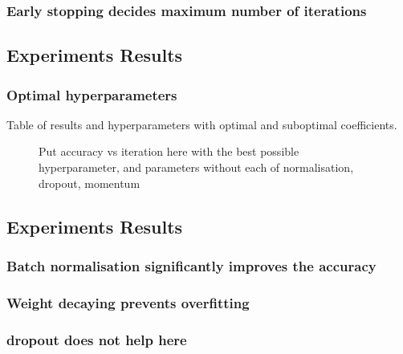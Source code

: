 \subsubsection{Early stopping decides maximum number of iterations}

\subsection{Experiments Results}
\subsubsection{Optimal hyperparameters}

Table of results and hyperparameters with optimal and suboptimal coefficients.

\begin{figure}
	\centering
\caption{Put accuracy vs iteration here with the best possible hyperparameter, and parameters without each of normalisation, dropout, momentum}\label{noisesklnmff}
\end{figure}


\begin{table}
\caption{Results and parameters of the three best setups.}
\end{table}

\begin{table}
\caption{Results and parameters of different setups for 89.87 results.}
\end{table}


\subsection{Experiments Results}
\subsubsection{Batch normalisation significantly improves the accuracy}
\subsubsection{Weight decaying prevents overfitting}
\subsubsection{dropout does not help here}
